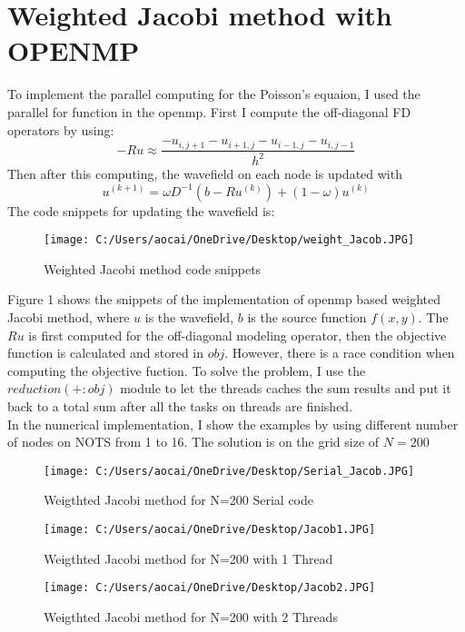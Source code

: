 \documentclass[12pt]{article}
\begin{document}
\section{Weighted Jacobi method with OPENMP}
To implement the parallel computing for the Poisson's equaion, I used the parallel for function in the openmp. First I compute the off-diagonal FD operators by using:
$$-Ru \approx \frac{-u_{i,j+1}-u_{i+1,j}-u_{i-1,j}-u_{i,j-1}}{h^2} $$
Then after this computing, the wavefield on each node is updated with
$$u^{(k+1)} = \omega D^{-1}(b-Ru^{(k)}) + (1-\omega)u^{(k)}$$
The code snippets for updating the wavefield is:
\begin{figure}[H]
	\centering
	\texttt{[image: C:/Users/aocai/OneDrive/Desktop/weight\_Jacob.JPG]}
	\caption[Optional caption]{Weighted Jacobi method code snippets}
	\label{fig:wj}
\end{figure}
Figure 1 shows the snippets of the implementation of openmp based weighted Jacobi method, where $u$ is the wavefield, $b$ is the source function $f(x,y)$. The $Ru$ is first computed for the off-diagonal modeling operator, then the objective function is calculated and stored in $obj$. However, there is a race condition when computing the objective fuction. To solve the problem, I use the $reduction(+:obj)$ module to let the threads caches the sum results and put it back to a total sum after all the tasks on threads are finished.\\

In the numerical implementation, I show the examples by using different number of nodes on NOTS from 1 to 16. The solution is on the grid size of $N=200$
\begin{figure}[H]
	\centering
	\texttt{[image: C:/Users/aocai/OneDrive/Desktop/Serial\_Jacob.JPG]}
	\caption[Optional caption]{Weigthted Jacobi method for N=200 Serial code}
	\label{JacobS}
\end{figure}

\begin{figure}[H]
	\centering
	\texttt{[image: C:/Users/aocai/OneDrive/Desktop/Jacob1.JPG]}
	\caption[Optional caption]{Weigthted Jacobi method for N=200 with 1 Thread}
	\label{Jacob1}
\end{figure}

\begin{figure}[H]
	\centering
	\texttt{[image: C:/Users/aocai/OneDrive/Desktop/Jacob2.JPG]}
	\caption[Optional caption]{Weigthted Jacobi method for N=200 with 2 Threads}
	\label{Jacob2}
\end{figure}
\end{document}
